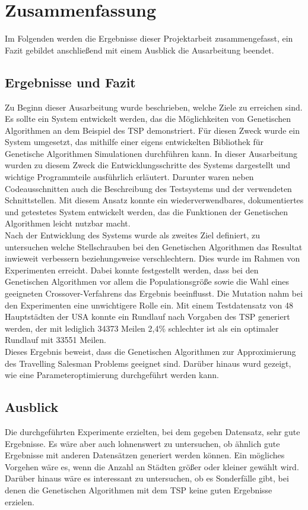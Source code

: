 
\section{Zusammenfassung}
Im Folgenden werden die Ergebnisse dieser Projektarbeit zusammengefasst, ein Fazit gebildet anschließend mit einem Ausblick die Ausarbeitung beendet.

\subsection{Ergebnisse und Fazit}
Zu Beginn dieser Ausarbeitung wurde beschrieben, welche Ziele zu erreichen sind. Es sollte ein System entwickelt werden, das die Möglichkeiten von Genetischen Algorithmen an dem Beispiel des TSP demonstriert. Für diesen Zweck wurde ein System umgesetzt, das mithilfe einer eigens entwickelten Bibliothek für Genetische Algorithmen Simulationen durchführen kann. In dieser Ausarbeitung wurden zu diesem Zweck die Entwicklungsschritte des Systems dargestellt und wichtige Programmteile ausführlich erläutert. Darunter waren neben Codeausschnitten auch die Beschreibung des Testsystems und der verwendeten Schnittstellen. 
Mit diesem Ansatz konnte ein wiederverwendbares, dokumentiertes und getestetes System entwickelt werden, das die Funktionen der Genetischen Algorithmen leicht nutzbar macht. \\
Nach der Entwicklung des Systems wurde als zweites Ziel definiert, zu untersuchen welche Stellschrauben bei den Genetischen Algorithmen das Resultat inwieweit verbessern beziehungsweise verschlechtern. Dies wurde im Rahmen von Experimenten erreicht. Dabei konnte festgestellt werden, dass bei den Genetischen Algorithmen vor allem die Populationsgröße sowie die Wahl eines geeigneten Crossover-Verfahrens das Ergebnis beeinflusst. Die Mutation nahm bei den Experimenten eine unwichtigere Rolle ein. Mit einem Testdatensatz von 48 Hauptstädten der USA konnte ein Rundlauf nach Vorgaben des TSP generiert werden, der mit lediglich 34373 Meilen 2,4\% schlechter ist als ein optimaler Rundlauf mit 33551 Meilen. \\
Dieses Ergebnis beweist, dass die Genetischen Algorithmen zur Approximierung des Travelling Salesman Problems geeignet sind. Darüber hinaus wurd gezeigt, wie eine Parameteroptimierung durchgeführt werden kann.
\subsection{Ausblick}
Die durchgeführten Experimente erzielten, bei dem gegeben Datensatz, sehr gute Ergebnisse. Es wäre aber auch lohnenswert zu untersuchen, ob ähnlich gute Ergebnisse mit anderen Datensätzen generiert werden können. Ein mögliches Vorgehen wäre es, wenn die Anzahl an Städten größer oder kleiner gewählt wird.
Darüber hinaus wäre es interessant zu untersuchen, ob es Sonderfälle gibt, bei denen die Genetischen Algorithmen mit dem TSP keine guten Ergebnisse erzielen.
